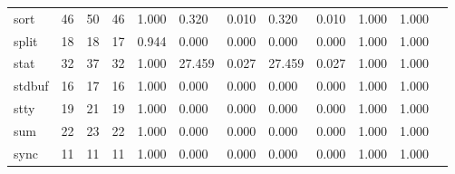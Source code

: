 \begin{longtable}{lp{1.00cm}p{1.00cm}p{1.00cm}p{1.00cm}p{1.00cm}p{1.00cm}p{1.00cm}p{1.00cm}p{1.00cm}p{1.00cm}p{1.00cm}}
sort      &                           46 &                 50 &                                46 &                                      1.000 &                                  0.320 &                                        0.010 &                             0.320 &                                   0.010 &                        1.000 &                                        1.000 \\
split     &                           18 &                 18 &                                17 &                                      0.944 &                                  0.000 &                                        0.000 &                             0.000 &                                   0.000 &                        1.000 &                                        1.000 \\
stat      &                           32 &                 37 &                                32 &                                      1.000 &                                 27.459 &                                        0.027 &                            27.459 &                                   0.027 &                        1.000 &                                        1.000 \\
stdbuf    &                           16 &                 17 &                                16 &                                      1.000 &                                  0.000 &                                        0.000 &                             0.000 &                                   0.000 &                        1.000 &                                        1.000 \\
stty      &                           19 &                 21 &                                19 &                                      1.000 &                                  0.000 &                                        0.000 &                             0.000 &                                   0.000 &                        1.000 &                                        1.000 \\
sum       &                           22 &                 23 &                                22 &                                      1.000 &                                  0.000 &                                        0.000 &                             0.000 &                                   0.000 &                        1.000 &                                        1.000 \\
sync      &                           11 &                 11 &                                11 &                                      1.000 &                                  0.000 &                                        0.000 &                             0.000 &                                   0.000 &                        1.000 &                                        1.000 \\

\end{longtable}
